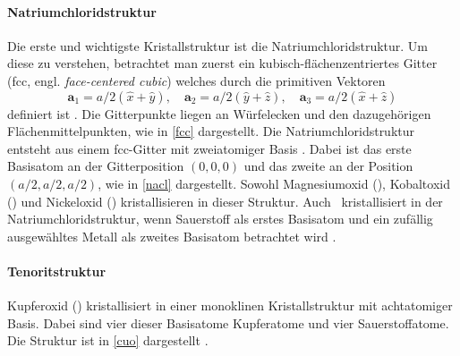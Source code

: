 \paragraph{Natriumchloridstruktur}
Die erste und wichtigste Kristallstruktur ist die Natriumchloridstruktur.
Um diese zu verstehen, betrachtet man zuerst ein kubisch-flächen\-zen\-trier\-tes Gitter (fcc, engl.
\textit{face-centered cubic}) welches durch die primitiven Vektoren
\begin{equation}
    \mathbf{a}_1 = a / 2 (\hat{x} + \hat{y}), \quad
    \mathbf{a}_2 = a / 2 (\hat{y} + \hat{z}), \quad
    \mathbf{a}_3 = a / 2 (\hat{x} + \hat{z})
    \label{eq:fcc}
\end{equation}
definiert ist \autocite{Grundmann}.
Die Gitterpunkte liegen an Würfelecken und den dazugehörigen Flächenmittelpunkten, wie in \cref{fcc} dargestellt.
Die Natriumchloridstruktur entsteht aus einem fcc-Gitter mit zweiatomiger Basis \autocite{Grundmann}.
Dabei ist das erste Basisatom an der Gitterposition $(0,0,0)$ und das zweite an der Position $(a/2,a/2,a/2)$, wie in
\cref{nacl} dargestellt.
Sowohl Magnesiumoxid (), Kobaltoxid () und Nickeloxid () kristallisieren in dieser Struktur.
Auch \heo\ kristallisiert in der Natriumchloridstruktur, wenn
Sauerstoff als erstes Basisatom und ein zufällig ausgewähltes Metall als zweites Basisatom betrachtet wird
\autocite{Rost2015}.

\paragraph{Tenoritstruktur}
Kupferoxid () kristallisiert in einer monoklinen Kristall\-struk\-tur mit achtatomiger Basis.
Dabei sind vier dieser Basisatome Kupferatome und vier Sauerstoffatome.
Die Struktur ist in \cref{cuo} dargestellt \autocite{kupferoxid}.

